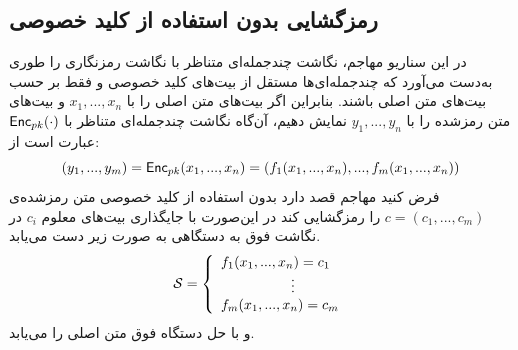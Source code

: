 \subsection{رمزگشایی بدون استفاده از کلید خصوصی}
در این سناریو مهاجم، نگاشت چندجمله‌ای متناظر با نگاشت رمزنگاری را طوری به‌دست می‌آورد که چندجمله‌ای‌ها مستقل از بیت‌های کلید خصوصی و فقط بر حسب بیت‌های متن اصلی باشند. 
بنابراین اگر بیت‌های متن اصلی را با 
$x_{1},...,x_{n}$
و بیت‌های متن رمزشده را با 
$y_{1},...,y_{n}$
نمایش دهیم، آن‌گاه نگاشت چندجمله‌ای متناظر با 
$\mathsf{Enc}_{pk}(\cdot)$
عبارت است از:
$$(y_{1},...,y_{m}) = \mathsf{Enc}_{pk}(x_{1},...,x_{n}) = (f_{1}(x_{1},...,x_{n}),..., f_{m}(x_{1},...,x_{n}))$$
فرض کنید مهاجم قصد دارد بدون استفاده از کلید خصوصی متن رمزشده‌ی 
$c = (c_{1},...,c_{m})$
را رمزگشایی کند در این‌صورت با جایگذاری بیت‌های معلوم 
$c_{i}$
در نگاشت فوق به دستگاهی به صورت زیر دست می‌یابد.
\begin{equation*}
\mS = \left \{ \begin{array}{ll}
f_{1}(x_{1},...,x_{n}) = c_{1}\\
\quad\tab\tab\vdots\\
f_{m}(x_{1},...,x_{n}) = c_{m}
\end{array} \right.
\end{equation*}
و با حل دستگاه فوق متن اصلی را می‌یابد.
